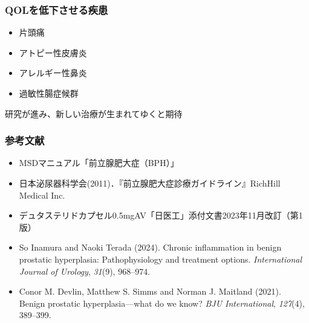 \documentclass[unicode, 12pt]{beamer}
\begin{document}
\begin{frame}
  \frametitle{QOLを低下させる疾患}
  \begin{itemize}
    \item 片頭痛
    \item アトピー性皮膚炎
    \item アレルギー性鼻炎
    \item 過敏性腸症候群
  \end{itemize}
  \vfill
  研究が進み、新しい治療が生まれてゆくと期待
\end{frame}
\begin{frame}
  \frametitle{参考文献}
  \begin{itemize}
    \item MSDマニュアル「前立腺肥大症（BPH）」
    \item 日本泌尿器科学会(2011)．『前立腺肥大症診療ガイドライン』RichHill Medical Inc.
    \item デュタステリドカプセル0.5mgAV「日医工」添付文書2023年11月改訂（第1版）
    \item So Inamura and Naoki Terada (2024).
      Chronic inflammation in benign prostatic hyperplasia: Pathophysiology and treatment options.
      \textit{International Journal of Urology}, \textit{31}(9), 968--974.
    \item Conor M. Devlin, Matthew S. Simms and Norman J. Maitland (2021).
      Benign prostatic hyperplasia---what do we know?
      \textit{BJU International}, \textit{127}(4), 389--399.
  \end{itemize}
\end{frame}
\end{document}
